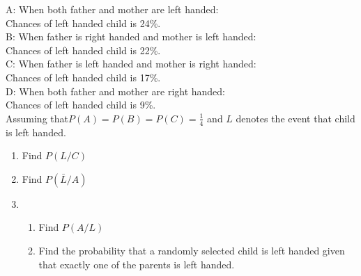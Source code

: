 \documentclass[12pt]{article}
\begin{document}
\begin{enumerate}
       A: When both father and mother are left handed:\\ Chances of left handed child is 24\%.\\
       B: When father is right handed and mother is left handed:\\ Chances of left handed child is 22\%.\\
       C:  When father is left handed and mother is right handed:\\ Chances of left handed child is 17\%.\\
       D:  When both father and mother are right handed:\\ Chances of left handed child is 9\%.\\
   Assuming that$P(A)=P(B)=P(C)=\frac{1}{4}$ and $L$ denotes the event that child is left handed.
   \begin{enumerate}
       \item Find $P(L/C)$
       \item Find $P(\bar L/A)$
       \item \begin{enumerate}
           \item Find $P(A/L)$
           \item Find the probability that a randomly selected child is left handed given that exactly one of the parents is left handed.
       \end{enumerate}
   \end{enumerate}
\end{enumerate}
\end{document}
